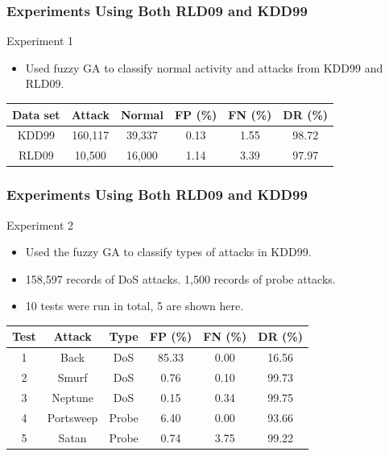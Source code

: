 \documentclass{beamer}
\begin{document}
\begin{frame}
	\frametitle{Experiments Using Both RLD09 and KDD99}
Experiment 1
	\begin{itemize}
		\item Used fuzzy GA to classify normal activity and attacks from KDD99 and RLD09.
	\end{itemize}
	
\begin{table}
\begin{tabular}{cccccc}
Data set & Attack & Normal & FP (\%) & FN (\%) & DR (\%)\\ \hline
KDD99 & 160,117 & 39,337 & 0.13 & 1.55 & 98.72\\
RLD09 & 10,500 & 16,000 & 1.14 & 3.39 & 97.97\\
\end{tabular}
\end{table}
\end{frame}


\begin{frame}
	\frametitle{Experiments Using Both RLD09 and KDD99}
Experiment 2
	\begin{itemize}
		\item Used the fuzzy GA to classify types of attacks in KDD99.
		\item 158,597 records of DoS attacks. 1,500 records of probe attacks.
		\item 10 tests were run in total, 5 are shown here.
	\end{itemize}
\begin{table}
\begin{tabular}{cccccc}
Test & Attack & Type & FP (\%) & FN (\%) & DR (\%)\\ \hline
1 & Back & DoS & 85.33 & 0.00 & 16.56\\
2 & Smurf & DoS & 0.76 & 0.10 & 99.73\\
3 & Neptune & DoS & 0.15 & 0.34 & 99.75\\
4 & Portsweep & Probe & 6.40 & 0.00 & 93.66\\
5 & Satan & Probe & 0.74 & 3.75 & 99.22\\
\end{tabular}
\end{table}

\end{frame}
\end{document}
